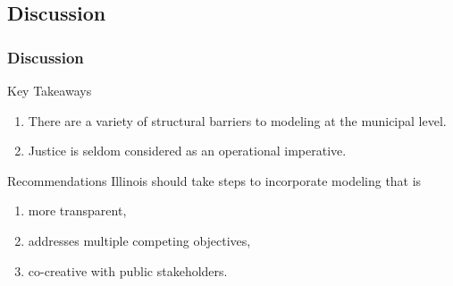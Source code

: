 \subsection{Discussion}
\begin{frame}
    \frametitle{Discussion}

    \begin{block}{Key Takeaways}
        \begin{enumerate}
            \item There are a variety of structural barriers to modeling at the municipal level.
            \item Justice is seldom considered as an operational imperative.
        \end{enumerate}
    \end{block}
    \begin{block}{Recommendations}
    Illinois should take steps to incorporate modeling that is
        \begin{enumerate}
                \item more transparent,
                \item addresses multiple competing objectives,
                \item co-creative with public stakeholders.
            \end{enumerate}
    \end{block}

\end{frame}